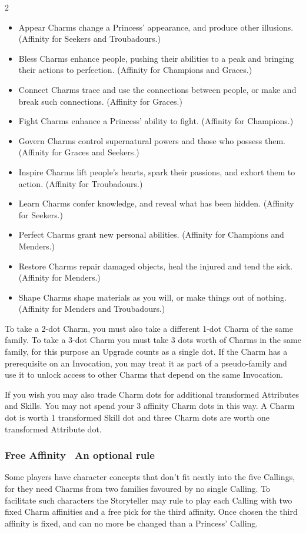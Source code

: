 \begin{multicols}{2}
\begin{itemize}
\item Appear Charms change a Princess’ appearance, and produce other illusions. (Affinity for Seekers and Troubadours.)
\item Bless Charms enhance people, pushing their abilities to a peak and bringing their actions to perfection.  (Affinity for Champions and Graces.)
\item Connect Charms trace and use the connections between people, or make and break such connections.  (Affinity for Graces.)
\item Fight Charms enhance a Princess’ ability to fight.  (Affinity for Champions.)
\item Govern Charms control supernatural powers and those who possess them.  (Affinity for Graces and Seekers.)
\item Inspire Charms lift people’s hearts, spark their passions, and exhort them to action.  (Affinity for Troubadours.)
\item Learn Charms confer knowledge, and reveal what has been hidden.  (Affinity for Seekers.)
\item Perfect Charms grant new personal abilities.  (Affinity for Champions and Menders.)
\item Restore Charms repair damaged objects, heal the injured and tend the sick.  (Affinity for Menders.)
\item Shape Charms shape materials as you will, or make things out of nothing.  (Affinity for Menders and Troubadours.)
\end{itemize}

To take a 2-dot Charm, you must also take a different 1-dot Charm of the same family. To take a 3-dot Charm you must take 3 dots worth of Charms in the same family, for this purpose an Upgrade counts as a single dot. If the Charm has a prerequisite on an Invocation, you may treat it as part of a pseudo-family and use it to unlock access to other Charms that depend on the same Invocation. 

If you wish you may also trade Charm dots for additional transformed Attributes and Skills. You may not spend your 3 affinity Charm dots in this way. A Charm dot is worth 1 transformed Skill dot and three Charm dots are worth one transformed Attribute dot.

\begin{mybox}


\subsubsection*{Free Affinity \textemdash\, An optional rule}
Some players have character concepts that don’t fit neatly into the five Callings, for they need Charms from two families favoured by no single Calling. To facilitate such characters the Storyteller may rule to play each Calling with two fixed Charm affinities and a free pick for the third affinity. Once chosen the third affinity is fixed, and can no more be changed than a Princess' Calling.


\end{mybox}
\end{multicols}
